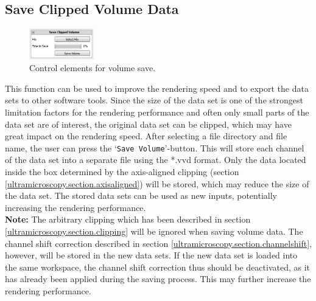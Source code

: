 \subsection{Save Clipped Volume Data} \label{ultramicroscopy.section.volumesave}
\begin{minipage}{\textwidth}
\begin{figure}
\vspace*{-0cm}
\centering
\includegraphics[width=0.25\textwidth]{images/save_clipped_volume.png}
\caption{Control elements for volume save.}
\label{ultramicroscopy.figure.volumesave}
\end{figure}
This function can be used to improve the rendering speed and to export the data sets to other software tools. Since the size of the data set is one of the strongest limitation factors for the rendering performance 
and often only small parts of the data set are of interest, the original data set can be clipped, which may have great impact on the rendering speed. 
After selecting a file directory and file name, the user can press the `\verb|Save Volume|'-button. 
This will store each channel of the data set into a separate file using the {*.vvd} format. 
Only the data located inside the box determined by the axis-aligned clipping (section \ref{ultramicroscopy.section.axisaligned}) will be stored, which 
may reduce the size of the data set. The stored data sets can be used as new inputs, potentially increasing the rendering performance.\\
\textbf{Note: } The arbitrary clipping which has been described in section \ref{ultramicroscopy.section.clipping} will be ignored when saving
volume data. The channel shift correction described in section \ref{ultramicroscopy.section.channelshift}, however, will be stored in the new data 
sets. If the new data set is loaded into the same workspace, the channel shift correction thus should be deactivated, as it has
already been applied during the saving process. This may further increase the rendering performance. 
\end{minipage}

\newpage
